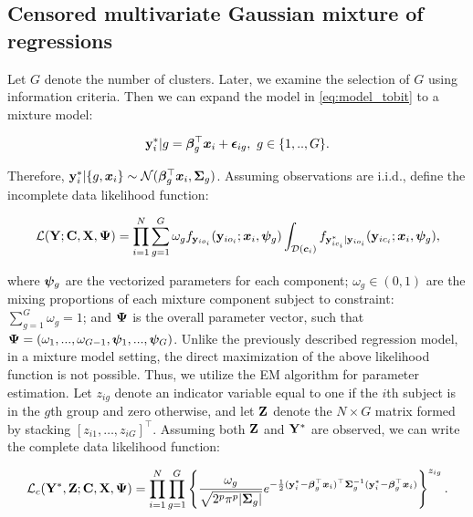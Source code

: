 \documentclass{interact}
\theoremstyle{plain}
\theoremstyle{definition}
\theoremstyle{remark}
\begin{document}
\subsection{Censored multivariate Gaussian mixture of regressions}
\label{sec:ourmodel}
Let $G$ denote the number of clusters. Later, we examine the selection of $G$ using information criteria. Then we can expand the model in \eqref{eq:model_tobit} to a mixture model:
\begin{linenomath}
\begin{align}
    \mathbf{y}_i^*|g={\bm \beta}_g^\top\bm{x}_i+\bm{\epsilon}_{ig},\ g\in \{1,..,G\}.\label{eq:model_ours}
\end{align}
\end{linenomath}
Therefore, $\mathbf{y}_i^*|\{g,\bm{x}_i\}\sim \mathcal{N}({\bm \beta}_g^\top\bm{x}_i,\bm{\Sigma}_g)$. Assuming observations are i.i.d., define the incomplete data likelihood function:
\begin{linenomath}
\begin{align}
    \mathcal{L}(\mathbf{Y};\mathbf{C},\mathbf{X},\bm{\Psi})=\prod_{i=1}^N\sum_{g=1}^G\omega_gf_{\mathbf{y}_{io_{i}}}(\mathbf{y}_{io_{i}};\bm{x}_i, \bm{\psi}_g)\int_{\mathcal{D}(\bm{c}_i)} f_{\mathbf{y}_{ic_{i}}^*|\mathbf{y}_{io_{i}}}(\mathbf{y}_{ic_{i}};\bm{x}_i,\bm{\psi}_g),\label{eq:incomplete_lik}
\end{align}
\end{linenomath}
where $\bm{\psi}_g$ are the vectorized parameters for each component; $\omega_g\in (0,1)$ are the mixing proportions of each mixture component subject to constraint: $\sum_{g=1}^G \omega_g=1$; and $\bm{\Psi}$ is the overall parameter vector, such that $\bm{\Psi}=(\omega_1,...,\omega_{G-1},\bm{\psi}_1,...,\bm{\psi}_G )$. Unlike the previously described regression model, in a mixture model setting, the direct maximization of the above likelihood function is not possible. Thus, we utilize the EM algorithm for parameter estimation. Let $z_{ig}$ denote an indicator variable equal to one if the $i$th subject is in the $g$th group and zero otherwise, and let $\mathbf{Z}$ denote the $N \times G$ matrix formed by stacking $[z_{i1},\dots,z_{iG}]^\top$. Assuming both $\mathbf{Z}$ and $\mathbf{Y}^*$ are observed, we can write the complete data likelihood function:
\begin{linenomath}
\begin{align}
    \mathcal{L}_c(\mathbf{Y}^*, \mathbf{Z} ;\mathbf{C},\mathbf{X},\bm{\Psi})=\prod_{i=1}^N\prod_{g=1}^G \left\{ \frac{\omega_g}{\sqrt{2^p\pi^p|\bm{\Sigma}_g|}}e^{-\frac{1}{2}(\mathbf{y}_i^*-{\bm \beta}_g^\top\bm{x}_i)^\top\bm{\Sigma}_g^{-1}(\mathbf{y}_i^*-{\bm \beta}_g^\top\bm{x}_i)}\right\}^{z_{ig}}.\label{eq:complete_lik}
\end{align}
\end{linenomath}
\end{document}
